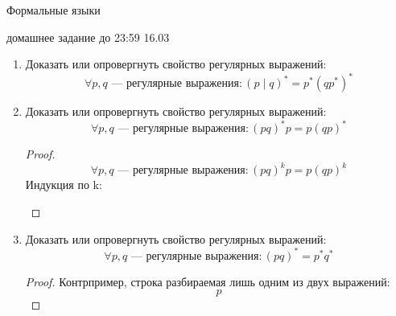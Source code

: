 \documentclass[12pt]{article}
\begin{document}
\begin{center} {\LARGE Формальные языки} \end{center}

\begin{center} \Large домашнее задание до 23:59 16.03 \end{center}
\bigskip

\begin{enumerate}
  \item Доказать или опровергнуть свойство регулярных выражений:
  \[
    \forall p, q \text{ --- регулярные выражения}: (p \mid q)^* = p^*(qp^*)^*
  \]

  \item Доказать или опровергнуть свойство регулярных выражений:
  \[
    \forall p, q \text{ --- регулярные выражения}: (p q)^* p = p (q p)^*
  \]

  \begin{proof}

    \[
      \forall p, q \text{ --- регулярные выражения}: (p q)^k p = p (q p)^k
    \]
    Индукция по k:
    \[\]
  \end{proof}
  \item Доказать или опровергнуть свойство регулярных выражений:
  \[
    \forall p, q \text{ --- регулярные выражения}: (p q)^* = p^* q^*
  \]

  \begin{proof}
    Контрпример, строка разбираемая лишь одним из двух выражений:
    \[
      p
    \]

  \end{proof}


\end{enumerate}
\end{document}
